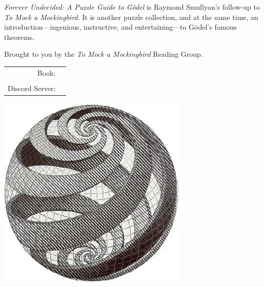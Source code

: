 \documentclass[letterpaper]{article}
\begin{document}


\emph{Forever Undecided: A Puzzle Guide to G\"odel} is Raymond Smullyan's follow-up to \emph{To Mock a Mockingbird}.  It is another puzzle collection, and at the same time, an introduction---ingenious, instructive, and entertaining---to G\"odel’s famous theorems.

\vspace{1em} \noindent Brought to you by the \emph{To Mock a Mockingbird} Reading Group.

\vspace{0.75in}

\begin{tabular}{rl}
    \csctimefont Book: & \\
    & \\
    \csctimefont Discord Server: & 
\end{tabular}

\vspace{0.75in}
\begin{center}
\includegraphics[scale = 0.75]{escher_spiral_ball.jpg}
\end{center}
\end{document}
